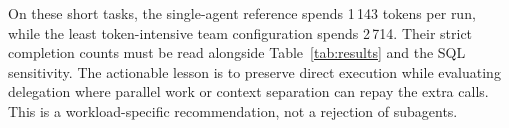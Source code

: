 On these short tasks, the single-agent reference spends 1\,143 tokens per run, while the least token-intensive team configuration spends 2\,714. Their strict completion counts must be read alongside Table~\ref{tab:results} and the SQL sensitivity. The actionable lesson is to preserve direct execution while evaluating delegation where parallel work or context separation can repay the extra calls. This is a workload-specific recommendation, not a rejection of subagents.
